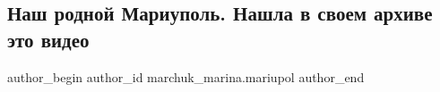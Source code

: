  
 
 
 
 

\subsection{Наш родной Мариуполь. Нашла в своем архиве это видео}
\label{sec:12_12_2022.fb.marchuk_marina.mariupol.1.nash_rodnoi_mariupol}

\ifcmt
 author_begin
   author_id marchuk_marina.mariupol
 author_end
\fi
